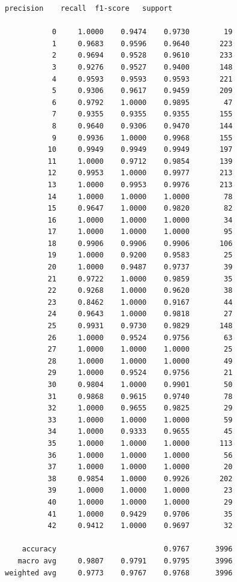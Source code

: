 \documentclass[11pt]{article}
\begin{document}
    \begin{Verbatim}[commandchars=\\\{\}]
              precision    recall  f1-score   support

           0     1.0000    0.9474    0.9730        19
           1     0.9683    0.9596    0.9640       223
           2     0.9694    0.9528    0.9610       233
           3     0.9276    0.9527    0.9400       148
           4     0.9593    0.9593    0.9593       221
           5     0.9306    0.9617    0.9459       209
           6     0.9792    1.0000    0.9895        47
           7     0.9355    0.9355    0.9355       155
           8     0.9640    0.9306    0.9470       144
           9     0.9936    1.0000    0.9968       155
          10     0.9949    0.9949    0.9949       197
          11     1.0000    0.9712    0.9854       139
          12     0.9953    1.0000    0.9977       213
          13     1.0000    0.9953    0.9976       213
          14     1.0000    1.0000    1.0000        78
          15     0.9647    1.0000    0.9820        82
          16     1.0000    1.0000    1.0000        34
          17     1.0000    1.0000    1.0000        95
          18     0.9906    0.9906    0.9906       106
          19     1.0000    0.9200    0.9583        25
          20     1.0000    0.9487    0.9737        39
          21     0.9722    1.0000    0.9859        35
          22     0.9268    1.0000    0.9620        38
          23     0.8462    1.0000    0.9167        44
          24     0.9643    1.0000    0.9818        27
          25     0.9931    0.9730    0.9829       148
          26     1.0000    0.9524    0.9756        63
          27     1.0000    1.0000    1.0000        25
          28     1.0000    1.0000    1.0000        49
          29     1.0000    0.9524    0.9756        21
          30     0.9804    1.0000    0.9901        50
          31     0.9868    0.9615    0.9740        78
          32     1.0000    0.9655    0.9825        29
          33     1.0000    1.0000    1.0000        59
          34     1.0000    0.9333    0.9655        45
          35     1.0000    1.0000    1.0000       113
          36     1.0000    1.0000    1.0000        56
          37     1.0000    1.0000    1.0000        20
          38     0.9854    1.0000    0.9926       202
          39     1.0000    1.0000    1.0000        23
          40     1.0000    1.0000    1.0000        29
          41     1.0000    0.9429    0.9706        35
          42     0.9412    1.0000    0.9697        32

    accuracy                         0.9767      3996
   macro avg     0.9807    0.9791    0.9795      3996
weighted avg     0.9773    0.9767    0.9768      3996

    \end{Verbatim}
\end{document}
